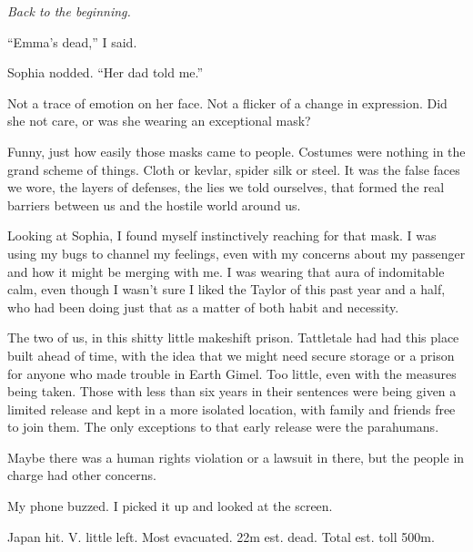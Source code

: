 





\emph{Back to the beginning.}



``Emma's dead,'' I said.



Sophia nodded.  ``Her dad told me.''



Not a trace of emotion on her face.  Not a flicker of a change in expression.  Did she not care, or was she wearing an exceptional mask?



Funny, just how easily those masks came to people.  Costumes were nothing in the grand scheme of things.  Cloth or kevlar, spider silk or steel.  It was the false faces we wore, the layers of defenses, the lies we told ourselves, that formed the real barriers between us and the hostile world around us.



Looking at Sophia, I found myself instinctively reaching for that mask.  I was using my bugs to channel my feelings, even with my concerns about my passenger and how it might be merging with me.  I was wearing that aura of indomitable calm, even though I wasn't sure I liked the Taylor of this past year and a half, who had been doing just that as a matter of both habit and necessity.



The two of us, in this shitty little makeshift prison.  Tattletale had had this place built ahead of time, with the idea that we might need secure storage or a prison for anyone who made trouble in Earth Gimel.  Too little, even with the measures being taken.  Those with less than six years in their sentences were being given a limited release and kept in a more isolated location, with family and friends free to join them.  The only exceptions to that early release were the parahumans.



Maybe there was a human rights violation or a lawsuit in there, but the people in charge had other concerns.



My phone buzzed.  I picked it up and looked at the screen.



Japan hit.  V. little left.  Most evacuated.  22m est. dead.  Total est. toll 500m.



